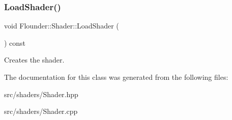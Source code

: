 \subsubsection{\texorpdfstring{Load\+Shader()}{LoadShader()}}
{\footnotesize\ttfamily void Flounder\+::\+Shader\+::\+Load\+Shader (\begin{DoxyParamCaption}{ }\end{DoxyParamCaption}) const\hspace{0.3cm}{\ttfamily [private]}}



Creates the shader. 



The documentation for this class was generated from the following files\+:\begin{DoxyCompactItemize}
\item 
src/shaders/Shader.\+hpp\item 
src/shaders/Shader.\+cpp\end{DoxyCompactItemize}
